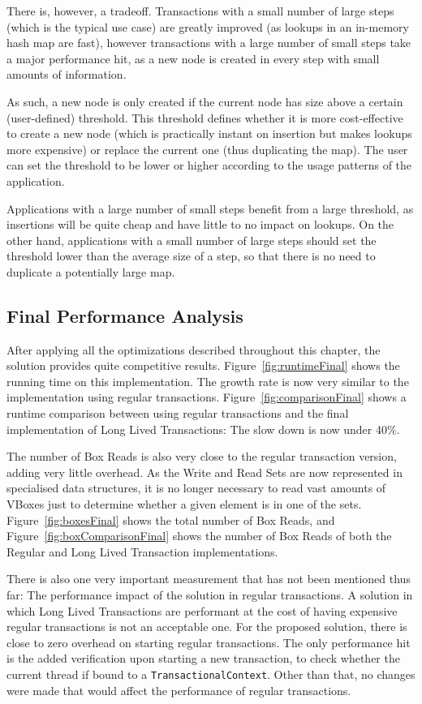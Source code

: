 \documentclass{llncs}
\begin{document}
There is, however, a tradeoff. Transactions with a small number of large
steps (which is the typical use case) are greatly improved (as lookups
in an in-memory hash map are fast), however transactions with a large
number of small steps take a major performance hit, as a new node is
created in every step with small amounts of information.

As such, a new node is only created if the current node has size above
a certain (user-defined) threshold. This threshold defines whether it
is more cost-effective to create a new node (which is practically
instant on insertion but makes lookups more expensive) or replace the
current one (thus duplicating the map). The user can set the threshold
to be lower or higher according to the usage patterns of the
application.

Applications with a large number of small steps benefit from a large
threshold, as insertions will be quite cheap and have little to no
impact on lookups. On the other hand, applications with a small number
of large steps should set the threshold lower than the average size of
a step, so that there is no need to duplicate a potentially large map.

\subsection{Final Performance Analysis}

After applying all the optimizations described throughout this
chapter, the solution provides quite competitive
results. Figure~\ref{fig:runtimeFinal} shows the running time on this
implementation. The growth rate is now very similar to the
implementation using regular
transactions. Figure~\ref{fig:comparisonFinal} shows a runtime
comparison between using regular transactions and the final
implementation of Long Lived Transactions: The slow down is now under
40\%.

The number of Box Reads is also very close to the regular transaction
version, adding very little overhead. As the Write and Read Sets are
now represented in specialised data structures, it is no longer
necessary to read vast amounts of VBoxes just to determine whether a
given element is in one of the sets. Figure~\ref{fig:boxesFinal} shows
the total number of Box Reads, and Figure~\ref{fig:boxComparisonFinal}
shows the number of Box Reads of both the Regular and Long Lived
Transaction implementations.

There is also one very important measurement that has not been
mentioned thus far: The performance impact of the solution in regular
transactions. A solution in which Long Lived Transactions are
performant at the cost of having expensive regular transactions is not
an acceptable one. For the proposed solution, there is close to zero
overhead on starting regular transactions. The only performance hit is
the added verification upon starting a new transaction, to check
whether the current thread if bound to a
\texttt{TransactionalContext}. Other than that, no changes were made
that would affect the performance of regular transactions.
\end{document}
